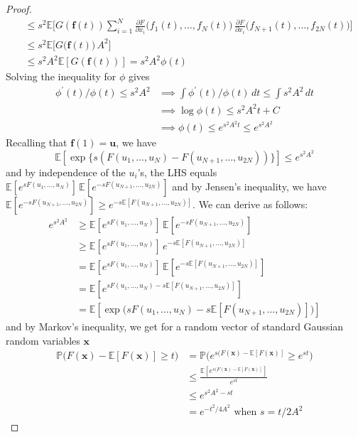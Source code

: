 \documentclass{article}
\begin{document}
\begin{proof}
\begin{align*}
      & \leq s^2 \mathbb{E} \bigg[ G(\mathbf{f}(t)) \sum_{i=1}^N \frac{\partial F}{\partial x_i} \big( f_1 (t), \ldots, f_N (t) \big) \, \frac{\partial F}{\partial x_i} \big( f_{N+1} (t), \ldots, f_{2N} (t) \big) \bigg] \\ 
      & \leq s^2 \mathbb{E} \big[ G(\mathbf{f}(t) \big) \, A^2 \big] \\
      & \leq s^2 A^2 \mathbb{E}[G(\mathbf{f}(t))] = s^2 A^2 \phi(t)
  \end{align*}
  Solving the inequality for $\phi$ gives 
  \begin{align*}
      \phi^\prime (t) / \phi(t) \leq s^2 A^2 & \implies \int \phi^\prime (t) / \phi(t) \,dt \leq \int s^2 A^2 \,dt \\
      & \implies \log{\phi(t)} \leq s^2 A^2 t + C \\
      & \implies \phi(t) \leq e^{s^2 A^2 t} \leq e^{s^2 A^2}
  \end{align*}
  Recalling that $\mathbf{f}(1) = \mathbf{u}$, we have 
  \[\mathbb{E}[\exp\{ s ( F(u_1, \ldots, u_N) - F(u_{N+1}, \ldots, u_{2N})) \}] \leq e^{s^2 A^2}\]
  and by independence of the $u_i$'s, the LHS equals $\mathbb{E}[e^{s F(u_1, \ldots, u_N)}]\, \mathbb{E}[e^{-s F(u_{N+1}, \ldots, u_{2N})}]$ and by Jensen's inequality, we have $\mathbb{E}[e^{-s F(u_{N+1}, \ldots, u_{2N})}] \geq e^{-s \mathbb{E}[F(u_{N+1}, \ldots, u_{2N})]}$. We can derive as follows: 
  \begin{align*}
      e^{s^2 A^2} & \geq \mathbb{E}[e^{s F(u_1, \ldots, u_N)}]\, \mathbb{E}[e^{-s F(u_{N+1}, \ldots, u_{2N})}] \\
      & \geq \mathbb{E}[e^{s F(u_1, \ldots, u_N)}]\, e^{-s \mathbb{E}[F(u_{N+1}, \ldots, u_{2N})]} \\
      & = \mathbb{E}[e^{s F(u_1, \ldots, u_N)}]\, \mathbb{E}[e^{-s \mathbb{E}[F(u_{N+1}, \ldots, u_{2N})]}] \\
      & = \mathbb{E}[e^{s F(u_1, \ldots, u_N) -s \mathbb{E}[F(u_{N+1}, \ldots, u_{2N})]}] \\
      & = \mathbb{E}[\exp \big( s F(u_1, \ldots, u_N) -s \mathbb{E}[F(u_{N+1}, \ldots, u_{2N})] \big) ]
  \end{align*}
  and by Markov's inequality, we get for a random vector of standard Gaussian random variables $\mathbf{x}$
  \begin{align*}
      \mathbb{P} \big( F(\mathbf{x}) - \mathbb{E}[F(\mathbf{x})] \geq t) & = \mathbb{P} \big( e^{s( F(\mathbf{x}) - \mathbb{E}[F(\mathbf{x})]} \geq e^{st} \big) \\
      & \leq \frac{\mathbb{E}[e^{s( F(\mathbf{x}) - \mathbb{E}[F(\mathbf{x})]}]}{e^{st}} \\
      & \leq e^{s^2 A^2 - st} \\
      & = e^{- t^2 / 4A^2} \text{ when } s = t / 2A^2
  \end{align*}
  \end{proof}
\end{document}
